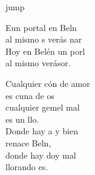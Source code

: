 \begin{cancion}[En un portal][]jump\\
	\begin{chorus}%
		Eun portal  en Beln\\
		al mismo s verás nar  \\
		Hoy en Belén un porl\\
		al mismo  verásor.\jump\\
	\end{chorus}%
	Cualquier cón de amor\\
	es cuna de os\\
	cualquier gemel mal\\
	es un llo.\\
	\jump
	Donde hay a y bien\\
	renace Beln,\\
	donde hay doy mal\\
	llorando es.\\
\end{cancion}%
